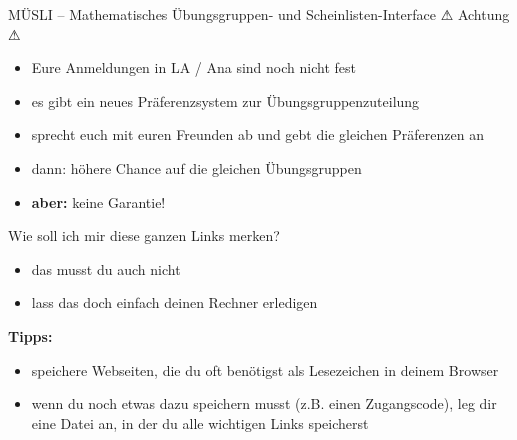 \begin{frame}{MÜSLI -- \normalsize Mathematisches Übungsgruppen- und Scheinlisten-Interface}
	 \Large {\LARGE \DejaSans{} ⚠} Achtung {\LARGE \DejaSans{}⚠} \\
	\normalsize
\begin{itemize}
	\item Eure Anmeldungen in LA / Ana sind noch nicht fest
	\item es gibt ein neues Präferenzsystem zur Übungsgruppenzuteilung
	\item sprecht euch mit euren Freunden ab und gebt die gleichen Präferenzen an
	\item dann: höhere Chance auf die gleichen Übungsgruppen
	\item \textbf{aber:} keine Garantie!
\end{itemize}
\end{frame}

\begin{frame}{Wie soll ich mir diese ganzen Links merken?}
	\begin{itemize}
		\item das musst du auch nicht
		\item lass das doch einfach deinen Rechner erledigen
	\end{itemize}
	\textbf{Tipps:}
	\begin{itemize}
		\item speichere Webseiten, die du oft benötigst als Lesezeichen in deinem Browser
		\item wenn du noch etwas dazu speichern musst (z.B. einen Zugangscode), leg dir eine Datei an, in der du alle wichtigen Links speicherst
	\end{itemize}
\end{frame}


